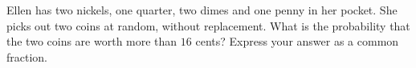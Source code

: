 Ellen has two nickels, one quarter, two dimes and one penny in her pocket. She picks out two coins at random, without replacement. What is the probability that the two coins are worth more than $16$ cents? Express your answer as a common fraction.
